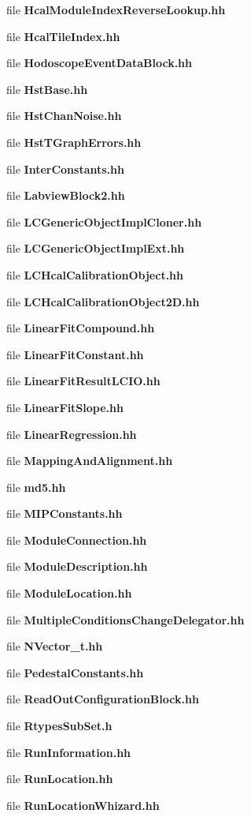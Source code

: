 \begin{DoxyCompactItemize}
file {\bfseries HcalModuleIndexReverseLookup.hh}
\item 
file {\bfseries HcalTileIndex.hh}
\item 
file {\bfseries HodoscopeEventDataBlock.hh}
\item 
file {\bfseries HstBase.hh}
\item 
file {\bfseries HstChanNoise.hh}
\item 
file {\bfseries HstTGraphErrors.hh}
\item 
file {\bfseries InterConstants.hh}
\item 
file {\bfseries LabviewBlock2.hh}
\item 
file {\bfseries LCGenericObjectImplCloner.hh}
\item 
file {\bfseries LCGenericObjectImplExt.hh}
\item 
file {\bfseries LCHcalCalibrationObject.hh}
\item 
file {\bfseries LCHcalCalibrationObject2D.hh}
\item 
file {\bfseries LinearFitCompound.hh}
\item 
file {\bfseries LinearFitConstant.hh}
\item 
file {\bfseries LinearFitResultLCIO.hh}
\item 
file {\bfseries LinearFitSlope.hh}
\item 
file {\bfseries LinearRegression.hh}
\item 
file {\bfseries MappingAndAlignment.hh}
\item 
file {\bfseries md5.hh}
\item 
file {\bfseries MIPConstants.hh}
\item 
file {\bfseries ModuleConnection.hh}
\item 
file {\bfseries ModuleDescription.hh}
\item 
file {\bfseries ModuleLocation.hh}
\item 
file {\bfseries MultipleConditionsChangeDelegator.hh}
\item 
file {\bfseries NVector\_\-t.hh}
\item 
file {\bfseries PedestalConstants.hh}
\item 
file {\bfseries ReadOutConfigurationBlock.hh}
\item 
file {\bfseries RtypesSubSet.h}
\item 
file {\bfseries RunInformation.hh}
\item 
file {\bfseries RunLocation.hh}
\item 
file {\bfseries RunLocationWhizard.hh}
\item 

\end{DoxyCompactItemize}
